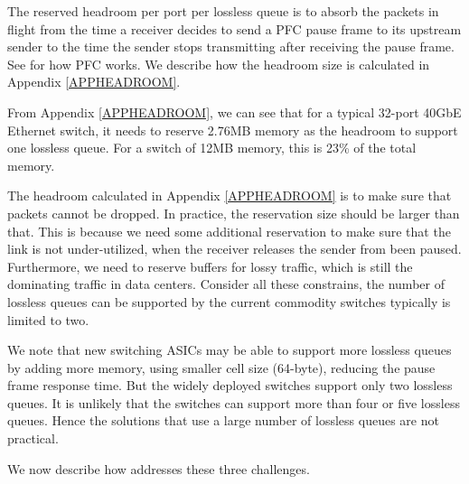 The reserved headroom per port per lossless queue is to absorb the packets in
flight from the time a receiver decides to send a PFC pause frame to its
upstream sender to the time the sender stops transmitting after receiving the
pause frame. See \cite{rdmaatscale} for how PFC works. We describe how the
headroom size is calculated in Appendix \ref{APPHEADROOM}.

From Appendix \ref{APPHEADROOM}, we can see that for a typical 32-port 40GbE
Ethernet switch, it needs to reserve 2.76MB memory as the headroom to support
one lossless queue. For a switch of 12MB memory, this is 23\% of the total
memory.

The headroom calculated in Appendix \ref{APPHEADROOM} is to make sure that
packets cannot be dropped. In practice, the reservation size should be larger
than that. This is because we need some additional reservation to make sure that
the link is not under-utilized, when the receiver releases the sender from been
paused. Furthermore, we need to reserve buffers for lossy traffic, which is
still the dominating traffic in data centers. Consider all these constrains, the
number of lossless queues can be supported by the current commodity switches
typically is limited to two.

We note that new switching ASICs may be able to support more lossless queues by
adding more memory, using smaller cell size (64-byte), reducing the pause frame
response time. But the widely deployed switches support only two lossless
queues. It is unlikely that the switches can support more than four or five
lossless queues. Hence the solutions that use a large number of lossless queues
are not practical. 

We now describe how \sysname{} addresses these three challenges. 
